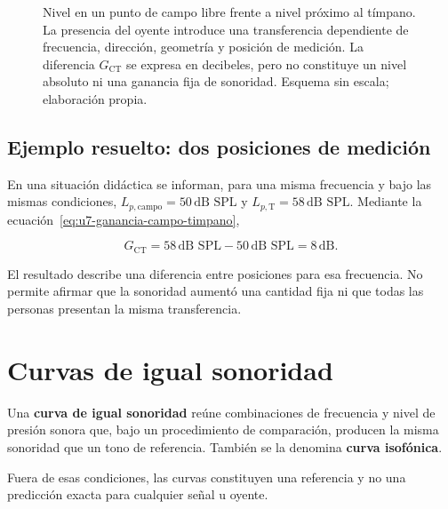 \begin{figure}[htbp]
    \centering
    
    \caption{Nivel en un punto de campo libre frente a nivel próximo al
    tímpano. La presencia del oyente introduce una transferencia dependiente de
    frecuencia, dirección, geometría y posición de medición. La diferencia
    \(G_{\mathrm{CT}}\) se expresa en decibeles, pero no constituye un nivel
    absoluto ni una ganancia fija de sonoridad. Esquema sin escala; elaboración
    propia.}
    \label{fig:u7-campo-cae-timpano}
\end{figure}

\subsection{Ejemplo resuelto: dos posiciones de medición}
\label{sec:u7-ejemplo-campo-timpano}

En una situación didáctica se informan, para una misma frecuencia y bajo las
mismas condiciones, \(L_{p,\mathrm{campo}}=50\,\text{dB SPL}\) y
\(L_{p,\mathrm{T}}=58\,\text{dB SPL}\). Mediante la
ecuación~\eqref{eq:u7-ganancia-campo-timpano},

\[
    G_{\mathrm{CT}}
      =58\,\text{dB SPL}-50\,\text{dB SPL}
      =8\,\text{dB}.
\]

El resultado describe una diferencia entre posiciones para esa frecuencia.
No permite afirmar que la sonoridad aumentó una cantidad fija ni que todas las
personas presentan la misma transferencia.

\section{Curvas de igual sonoridad}
\label{sec:u7-isofonicas}

Una \textbf{curva de igual sonoridad} reúne combinaciones de frecuencia y
nivel de presión sonora que, bajo un procedimiento de comparación, producen
la misma sonoridad que un tono de referencia. También se la denomina
\textbf{curva isofónica}.

 Fuera de esas
condiciones, las curvas constituyen una referencia y no una predicción exacta
para cualquier señal u oyente.

